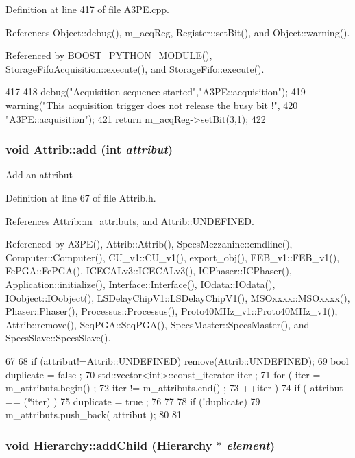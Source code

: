 Definition at line 417 of file A3PE.cpp.

References Object::debug(), m\_\-acqReg, Register::setBit(), and Object::warning().

Referenced by BOOST\_\-PYTHON\_\-MODULE(), StorageFifoAcquisition::execute(), and StorageFifo::execute().


\begin{DoxyCode}
417                             {
418   debug("Acquisition sequence started","A3PE::acquisition");
419   warning("This acquisition trigger does not release the busy bit !",
420       "A3PE::acquisition");
421   return m_acqReg->setBit(3,1);
422 }
\end{DoxyCode}
\hypertarget{classAttrib_a235f773af19c900264a190b00a3b4ad7}{
\subsubsection[{add}]{\setlength{\rightskip}{0pt plus 5cm}void Attrib::add (int {\em attribut})}}
\label{classAttrib_a235f773af19c900264a190b00a3b4ad7}
Add an attribut 

Definition at line 67 of file Attrib.h.

References Attrib::m\_\-attributs, and Attrib::UNDEFINED.

Referenced by A3PE(), Attrib::Attrib(), SpecsMezzanine::cmdline(), Computer::Computer(), CU\_\-v1::CU\_\-v1(), export\_\-obj(), FEB\_\-v1::FEB\_\-v1(), FePGA::FePGA(), ICECALv3::ICECALv3(), ICPhaser::ICPhaser(), Application::initialize(), Interface::Interface(), IOdata::IOdata(), IOobject::IOobject(), LSDelayChipV1::LSDelayChipV1(), MSOxxxx::MSOxxxx(), Phaser::Phaser(), Processus::Processus(), Proto40MHz\_\-v1::Proto40MHz\_\-v1(), Attrib::remove(), SeqPGA::SeqPGA(), SpecsMaster::SpecsMaster(), and SpecsSlave::SpecsSlave().


\begin{DoxyCode}
67                             {
68     if (attribut!=Attrib::UNDEFINED) remove(Attrib::UNDEFINED);
69     bool duplicate = false ;
70     std::vector<int>::const_iterator iter ;
71     for ( iter  = m_attributs.begin() ;
72           iter != m_attributs.end()   ;
73           ++iter ) {
74       if ( attribut == (*iter) ) {
75         duplicate = true ;
76       }
77     }
78     if (!duplicate) {
79       m_attributs.push_back( attribut );
80     }
81   }
\end{DoxyCode}
\hypertarget{classHierarchy_ad677774ff38fcb257c04a3a10d471fac}{
\subsubsection[{addChild}]{\setlength{\rightskip}{0pt plus 5cm}void Hierarchy::addChild ({\bf Hierarchy} $\ast$ {\em element})}}
\label{classHierarchy_ad677774ff38fcb257c04a3a10d471fac}


